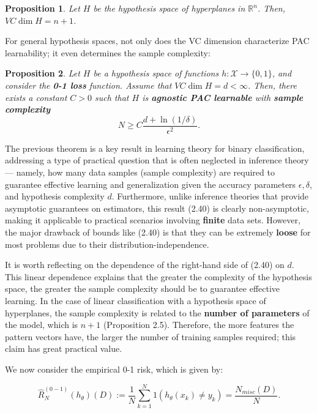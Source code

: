 \documentclass{report}
\newtheorem{proposition}{Proposition}[chapter]
\begin{document}
\begin{proposition}
Let $H$ be the hypothesis space of hyperplanes in $\mathbb{R}^n$. Then, $VC\dim H = n + 1$.
\end{proposition}

For general hypothesis spaces, not only does the VC dimension characterize PAC learnability; it even determines the sample complexity:
\begin{proposition}
Let $H$ be a hypothesis space of functions $h : \mathcal{X} \to \{0, 1\}$, and consider the \textbf{0-1 loss} function. Assume that $VC\dim H = d < \infty$. Then, there exists a constant $C> 0$ such that $H$ is \textbf{agnostic PAC learnable} with \textbf{sample complexity}
\begin{equation}
 N \geq C\frac{d + \ln (1/\delta)}{\epsilon^2}.
\end{equation}
\end{proposition}

The previous theorem is a key result in learning theory for binary classification, addressing a type of practical question that is often neglected in inference theory — namely, how many data samples (sample complexity) are required to guarantee effective learning and generalization given the accuracy parameters $\epsilon, \delta$, and hypothesis complexity $d$. Furthermore, unlike inference theories that provide asymptotic guarantees on estimators, this result (2.40) is clearly non-asymptotic, making it applicable to practical scenarios involving \textbf{finite} data sets. However, the major drawback of bounds like (2.40) is that they can be extremely \textbf{loose} for most problems due to their distribution-independence.

It is worth reflecting on the dependence of the right-hand side of (2.40) on $d$. This linear dependence explains that the greater the complexity of the hypothesis space, the greater the sample complexity should be to guarantee effective learning. In the case of linear classification with a hypothesis space of hyperplanes, the sample complexity is related to the \textbf{number of parameters} of the model, which is $n + 1$ (Proposition 2.5). Therefore, the more features the pattern vectors have, the larger the number of training samples required; this claim has great practical value.

We now consider the empirical 0-1 risk, which is given by:

\begin{equation}
\hat{R}^{(0-1)}_N(h_\theta)(D) := \frac{1}{N}\sum_{k=1}^{N}1(h_\theta(x_k) \neq y_k) = \frac{N_{misc}(D)}{N}.
\end{equation}
\end{document}
